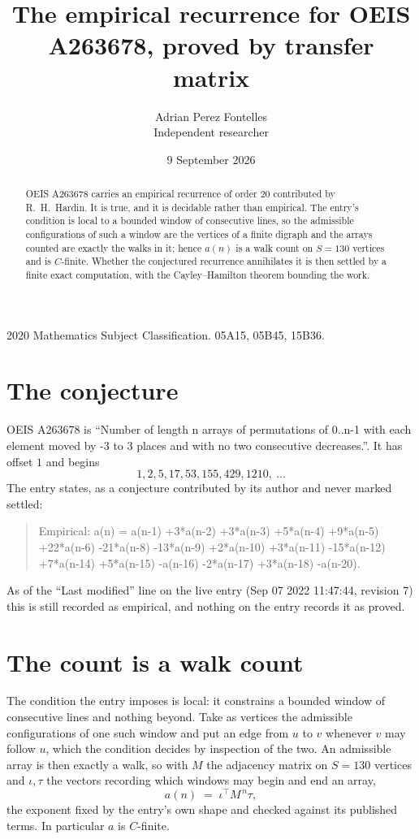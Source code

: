 \documentclass[11pt,a4paper]{article}
\title{The empirical recurrence for OEIS A263678, proved by transfer matrix}
\author{Adrian Perez Fontelles\\ \small Independent researcher}
\date{9 September 2026}
\theoremstyle{plain}
\theoremstyle{definition}
\begin{document}
\maketitle

\begin{abstract}
OEIS A263678 carries an empirical recurrence of order $20$ contributed by R.~H.~Hardin. It is
true, and it is decidable rather than empirical. The entry's condition is local to a bounded window of consecutive lines, so
the admissible configurations of such a window are the vertices of a finite digraph and the
arrays counted are exactly the walks in it; hence $a(n)$ is a walk count on $S=130$ vertices
and is $C$-finite. Whether the conjectured recurrence annihilates it is then settled by a
finite exact computation, with the Cayley--Hamilton theorem bounding the work.
\end{abstract}

\noindent\small 2020 Mathematics Subject Classification. 05A15, 05B45, 15B36.\normalsize

\section{The conjecture}

OEIS A263678 is ``Number of length n arrays of permutations of 0..n-1 with each element moved by -3 to 3 places and with no two consecutive decreases.''. It has offset $1$ and begins
\[
1, 2, 5, 17, 53, 155, 429, 1210,\ \dots
\]
The entry states, as a conjecture contributed by its author and never marked settled:
\begin{quote}
Empirical: a(n) = a(n-1) +3*a(n-2) +3*a(n-3) +5*a(n-4) +9*a(n-5) +22*a(n-6) -21*a(n-8) -13*a(n-9) +2*a(n-10) +3*a(n-11) -15*a(n-12) +7*a(n-14) +5*a(n-15) -a(n-16) -2*a(n-17) +3*a(n-18) -a(n-20).
\end{quote}
As of the ``Last modified'' line on the live entry (Sep 07 2022 11:47:44, revision 7) this is still
recorded as empirical, and nothing on the entry records it as proved.

\section{The count is a walk count}

The condition the entry imposes is local: it constrains a bounded window of consecutive lines and nothing beyond. Take as
vertices the admissible configurations of one such window and put an edge from $u$ to $v$
whenever $v$ may follow $u$, which the condition decides by inspection of the two. An
admissible array is then exactly a walk, so with $M$ the adjacency matrix on $S=130$ vertices
and $\iota,\tau$ the vectors recording which windows may begin and end an array,
\[
a(n)\;=\;\iota^{\!\top}M^{\,n}\tau ,
\]
the exponent fixed by the entry's own shape and checked against its published terms. In
particular $a$ is $C$-finite.
\end{document}
